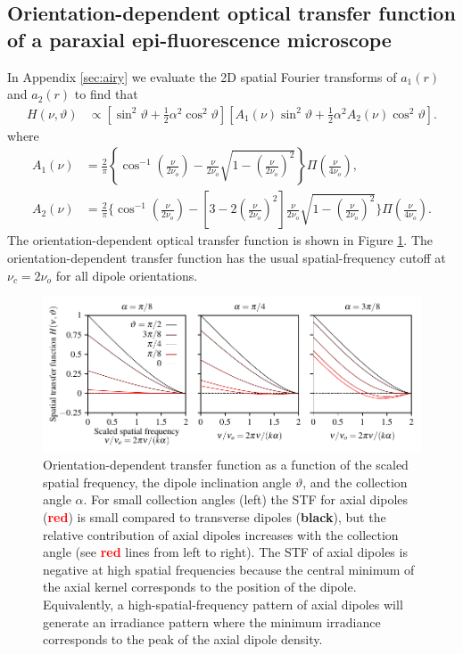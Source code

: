 \documentclass[]{osa-article}
\begin{document}
\subsection{Orientation-dependent optical transfer function of a paraxial epi-fluorescence microscope}\label{sec:trans}
  In Appendix \ref{sec:airy} we evaluate the 2D spatial Fourier transforms of
  $a_1(r)$ and $a_2(r)$ to find that
  \begin{align}
    H(\nu, \vartheta) &\propto \left[\sin^2\vartheta + \frac{1}{2}\alpha^2 \cos^2\vartheta\right]\left[A_1(\nu)\sin^2\vartheta + \frac{1}{2}\alpha^2 A_2(\nu)\cos^2\vartheta\right].
  \end{align}
  where 
\begin{align}
  A_1(\nu) &= \frac{2}{\pi}\left\{\cos^{-1}\left(\frac{\nu}{2\nu_o}\right) - \frac{\nu}{2\nu_o}\sqrt{1 - \left(\frac{\nu}{2\nu_o}\right)^2}\right\}\Pi\left(\frac{\nu}{4\nu_o}\right), \\
  A_2(\nu) &= \frac{2}{\pi}\Bigg\{\cos^{-1}\left(\frac{\nu}{2\nu_o}\right) - \left[3 - 2\left(\frac{\nu}{2\nu_o}\right)^2\right]\frac{\nu}{2\nu_o}\sqrt{1 - \left(\frac{\nu}{2\nu_o}\right)^2}\Bigg\}\Pi\left(\frac{\nu}{4\nu_o}\right).
\end{align}
The orientation-dependent optical transfer function is shown in Figure
\ref{fig:odotf}. The orientation-dependent transfer function has the usual
spatial-frequency cutoff at $\nu_c = 2\nu_o$ for all dipole orientations.

\begin{figure}[h]
 \centering
   \centering
   \includegraphics[scale=0.8]{../figures/stf/stf.pdf}
   \caption{Orientation-dependent transfer function as a function of the scaled
     spatial frequency, the dipole inclination angle $\vartheta$, and the
     collection angle $\alpha$. For small collection angles (left) the STF for
     axial dipoles (\textcolor{red}{\textbf{red}}) is small compared to
     transverse dipoles (\textbf{black}), but the relative contribution of axial
     dipoles increases with the collection angle (see
     \textcolor{red}{\textbf{red}} lines from left to right). The STF of axial
     dipoles is negative at high spatial frequencies because the central minimum
     of the axial kernel corresponds to the position of the dipole.
     Equivalently, a high-spatial-frequency pattern of axial dipoles will
     generate an irradiance pattern where the minimum irradiance corresponds to
     the peak of the axial dipole density.}
   \label{fig:odotf}
 \end{figure}
\end{document}
